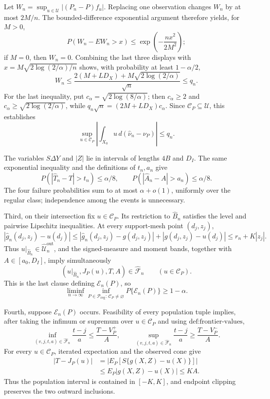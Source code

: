 Let \(W_n=\sup_{u\in\mathcal U}|(P_n-P)f_u|\).  Replacing one observation changes \(W_n\) by at most \(2M/n\).  The bounded-difference exponential argument therefore yields, for \(M>0\),
\[
 P(W_n-EW_n>x)\leq\exp\!\left(-\frac{nx^2}{2M^2}\right);
\]
if \(M=0\), then \(W_n=0\).  Combining the last three displays with \(x=M\sqrt{2\log(2/\alpha)/n}\) shows, with probability at least \(1-\alpha/2\),
\[
 W_n\leq\frac{2(M+LD_X)+M\sqrt{2\log(2/\alpha)}}{\sqrt n}\leq q_n.
\]
For the last inequality, put \(c_\alpha=\sqrt{2\log(8/\alpha)}\); then \(c_\alpha\geq2\) and \(c_\alpha\geq\sqrt{2\log(2/\alpha)}\), while \(q_n\sqrt n=(2M+LD_X)c_\alpha\).  Since \(\mathcal C_P\subseteq\mathcal U\), this establishes
\[
 \sup_{u\in\mathcal C_P}
 \left|\int_{X_0}u\,d(\widehat\nu_n-\nu_P)\right|\leq q_n.
\]

The variables \(S\Delta Y\) and \(|Z|\) lie in intervals of lengths \(4B\) and \(D_I\).  The same exponential inequality and the definitions of \(t_n,a_n\) give
\[
 P(|\widehat T_n-T|>t_n)\leq\alpha/8,
 \qquad
 P(|\widehat A_n-A|>a_n)\leq\alpha/8.
\]
The four failure probabilities sum to at most \(\alpha+o(1)\), uniformly over the regular class; independence among the events is unnecessary.

Third, on their intersection fix \(u\in\mathcal C_P\).  Its restriction to \(\widehat B_n\) satisfies the level and pairwise Lipschitz inequalities.  At every support-mesh point \((d_j,z_j)\),
\[
 |\widehat g_n(d_j,z_j)-u(d_j)|
 \leq|\widehat g_n(d_j,z_j)-g(d_j,z_j)|+|g(d_j,z_j)-u(d_j)|
 \leq r_n+K|z_j|.
\]
Thus \(u|_{\widehat B_n}\in\widehat{\mathcal U}_n^{\mathrm{out}}\), and the signed-measure and moment bands, together with \(A\in[a_0,D_I]\), imply simultaneously
\[
 (u|_{\widehat B_n},J_P(u),T,A)\in\widehat{\mathscr F}_n
 \qquad(u\in\mathcal C_P).
\]
This is the last clause defining \(\mathcal E_n(P)\), so
\[
 \liminf_{n\to\infty}\inf_{P\in\mathcal P_{\mathrm{reg}}:\,\mathcal C_P\neq\varnothing}
 P\{\mathcal E_n(P)\}\geq1-\alpha.
\]

Fourth, suppose \(\mathcal E_n(P)\) occurs.  Feasibility of every population tuple implies, after taking the infimum or supremum over \(u\in\mathcal C_P\) and using \(\text{def:frontier-values}\),
\[
 \inf_{(v,j,t,a)\in\widehat{\mathscr F}_n}\frac{t-j}{a}
 \leq\frac{T-V_P^+}{A},
 \qquad
 \sup_{(v,j,t,a)\in\widehat{\mathscr F}_n}\frac{t-j}{a}
 \geq\frac{T-V_P^-}{A}.
\]
For every \(u\in\mathcal C_P\), iterated expectation and the observed cone give
\[
 \begin{aligned}
 |T-J_P(u)|
 &=\left|E_P[S\{g(X,Z)-u(X)\}]\right|\\
 &\leq E_P|g(X,Z)-u(X)|\leq KA.
 \end{aligned}
\]
Thus the population interval is contained in \([-K,K]\), and endpoint clipping preserves the two outward inclusions.

